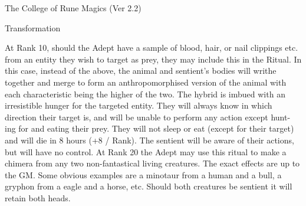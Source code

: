 \begin{Chapter}{The College of Rune Magics (Ver 2.2)}
\begin{ritual}[R-7]{Transformation }
\begin{effects}
At  Rank  10,  should  the  Adept  have  a  sample  of 
blood,  hair,  or  nail  clippings  etc.  from  an  entity 
they wish to target as prey, they may include this in 
the  Ritual.  In  this  case,  instead  of  the  above,  the 
animal  and  sentient’s  bodies  will  writhe  together 
and  merge  to  form  an  anthropomorphised  version 
of  the  animal  with  each  characteristic  being  the 
higher  of  the  two.  The  hybrid  is  imbued  with  an 
irresistible hunger for the targeted entity. They will 
always know in which direction their target is, and 
will  be  unable  to  perform  any  action  except  hunt-
ing for and eating their prey. They will not sleep or 
eat (except for their target) and will  die in 8 hours 
(+8  /  Rank).  The  sentient  will  be  aware  of  their 
actions,  but  will  have  no  control.  At  Rank  20  the 
Adept  may  use  this  ritual  to  make  a chimera  from 
any two non-fantastical living creatures. The exact 
effects  are up  to the  GM.  Some  obvious  examples 
are a minotaur from a human and a bull, a gryphon 
from  a  eagle  and  a  horse,  etc.  Should  both  creatures be sentient it will retain both heads. 

\end{effects}
\end{ritual}

\end{Chapter}
